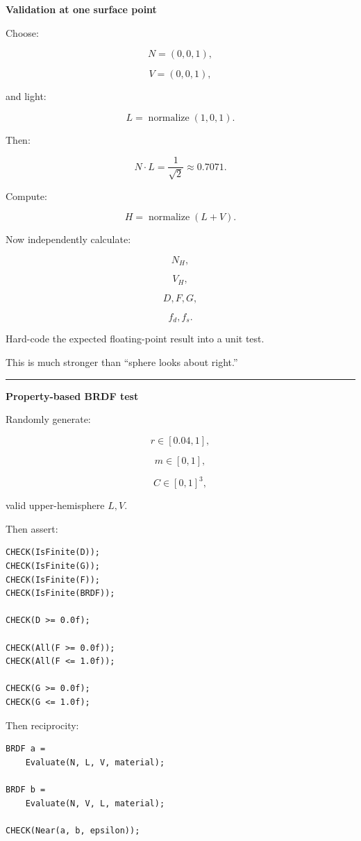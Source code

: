 \textbf{Validation at one surface point}

Choose:

\[
N=(0,0,1),
\]

\[
V=(0,0,1),
\]

and light:

\[
L=
\operatorname{normalize}(1,0,1).
\]

Then:

\[
N\cdot L
=
\frac1{\sqrt2}
\approx0.7071.
\]

Compute:

\[
H=
\operatorname{normalize}(L+V).
\]

Now independently calculate:

\[
N_H,
\]

\[
V_H,
\]

\[
D,
F,
G,
\]

\[
f_d,
f_s.
\]

Hard-code the expected floating-point result into a unit test.

This is much stronger than ``sphere looks about right.''

\begin{center}\rule{0.5\linewidth}{0.5pt}\end{center}

\textbf{Property-based BRDF test}

Randomly generate:

\[
r\in[0.04,1],
\]

\[
m\in[0,1],
\]

\[
C\in[0,1]^3,
\]

valid upper-hemisphere \(L,V\).

Then assert:

\begin{verbatim}
CHECK(IsFinite(D));
CHECK(IsFinite(G));
CHECK(IsFinite(F));
CHECK(IsFinite(BRDF));

CHECK(D >= 0.0f);

CHECK(All(F >= 0.0f));
CHECK(All(F <= 1.0f));

CHECK(G >= 0.0f);
CHECK(G <= 1.0f);
\end{verbatim}

Then reciprocity:

\begin{verbatim}
BRDF a =
    Evaluate(N, L, V, material);

BRDF b =
    Evaluate(N, V, L, material);

CHECK(Near(a, b, epsilon));
\end{verbatim}

